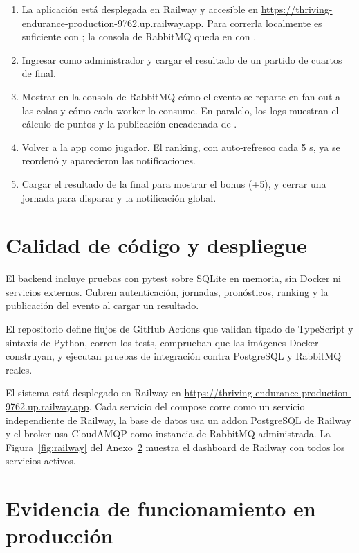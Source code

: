 \begin{enumerate}[leftmargin=1.8em]
\item La aplicación está desplegada en Railway y accesible en \url{https://thriving-endurance-production-9762.up.railway.app}. Para correrla localmente es suficiente con ; la consola de RabbitMQ queda en  con .
\item Ingresar como administrador y cargar el resultado de un partido de cuartos de final.
\item Mostrar en la consola de RabbitMQ cómo el evento se reparte en fan-out a las colas y cómo cada worker lo consume. En paralelo, los logs muestran el cálculo de puntos y la publicación encadenada de .
\item Volver a la app como jugador. El ranking, con auto-refresco cada 5 s, ya se reordenó y aparecieron las notificaciones.
\item Cargar el resultado de la final para mostrar el bonus (+5), y cerrar una jornada para disparar  y la notificación global.
\end{enumerate}

\section{Calidad de código y despliegue}
\label{anx:deploy}

El backend incluye pruebas con pytest sobre SQLite en memoria, sin Docker ni servicios externos. Cubren autenticación, jornadas, pronósticos, ranking y la publicación del evento al cargar un resultado.

El repositorio define flujos de GitHub Actions que validan tipado de TypeScript y sintaxis de Python, corren los tests, comprueban que las imágenes Docker construyan, y ejecutan pruebas de integración contra PostgreSQL y RabbitMQ reales.

El sistema está desplegado en Railway en \url{https://thriving-endurance-production-9762.up.railway.app}. Cada servicio del compose corre como un servicio independiente de Railway, la base de datos usa un addon PostgreSQL de Railway y el broker usa CloudAMQP como instancia de RabbitMQ administrada. La Figura~\ref{fig:railway} del Anexo~\ref{anx:evidencia} muestra el dashboard de Railway con todos los servicios activos.

\section{Evidencia de funcionamiento en producción}
\label{anx:evidencia}

